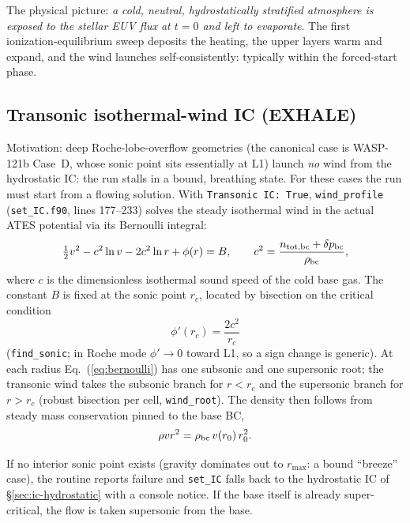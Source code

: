 \documentclass[english,a4paper]{my_memo}
\begin{document}
The physical picture: \emph{a cold, neutral, hydrostatically stratified
atmosphere is exposed to the stellar EUV flux at $t=0$ and left to
evaporate}. The first ionization-equilibrium sweep deposits the
heating, the upper layers warm and expand, and the wind launches
self-consistently: typically within the forced-start phase.

\subsection{Transonic isothermal-wind IC (EXHALE)}
\label{sec:ic-transonic}

Motivation: deep Roche-lobe-overflow geometries (the canonical case is
WASP-121b Case~D, whose sonic point sits essentially at L1) launch
\emph{no} wind from the hydrostatic IC: the run stalls in a bound,
breathing state. For these cases the run must start from a flowing
solution. With \texttt{Transonic IC: True}, \texttt{wind\_profile}
(\texttt{set\_IC.f90}, lines 177--233) solves the steady isothermal
wind in the actual ATES potential via its Bernoulli integral:
\begin{equation}
\tfrac12 v^2 - c^2 \ln v - 2c^2 \ln r + \phi(r) = B,
\qquad
c^2 = \frac{n_{\rm tot,bc} + \delta p_{\rm bc}}{\rho_{\rm bc}},
\label{eq:bernoulli}
\end{equation}
where $c$ is the dimensionless isothermal sound speed of the cold base
gas. The constant $B$ is fixed at the sonic point $r_c$, located by
bisection on the critical condition
\begin{equation}
\phi'(r_c) = \frac{2c^2}{r_c}
\end{equation}
(\texttt{find\_sonic}; in Roche mode $\phi' \to 0$ toward L1, so a
sign change is generic). At each radius Eq.~(\ref{eq:bernoulli}) has
one subsonic and one supersonic root; the transonic wind takes the
subsonic branch for $r < r_c$ and the supersonic branch for $r > r_c$
(robust bisection per cell, \texttt{wind\_root}). The density then
follows from steady mass conservation pinned to the base BC,
\begin{equation}
\rho v r^2 = \rho_{\rm bc}\, v(r_0)\, r_0^2 .
\end{equation}

If no interior sonic point exists (gravity dominates out to
$r_{\max}$: a bound ``breeze'' case), the routine reports failure and
\texttt{set\_IC} falls back to the hydrostatic IC of
\S\ref{sec:ic-hydrostatic} with a console notice. If the base itself
is already super-critical, the flow is taken supersonic from the base.
\end{document}
